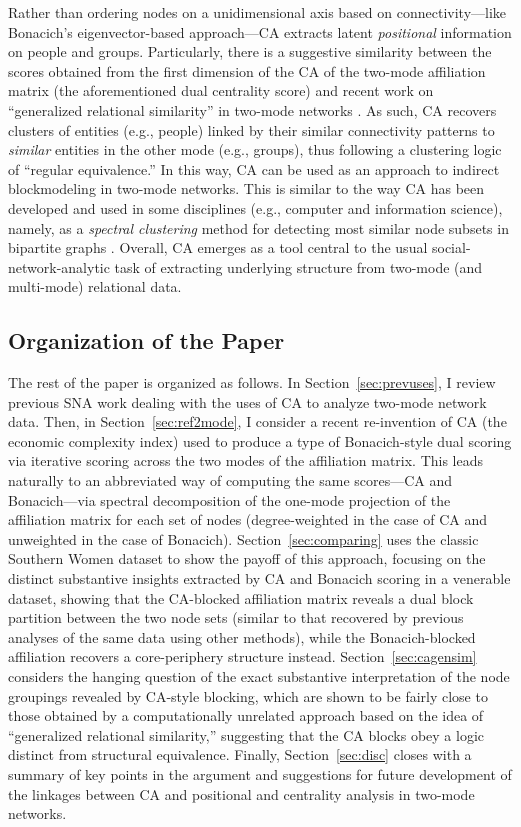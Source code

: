 \documentclass[a4paper,fleqn]{cas-sc}
\begin{document}
Rather than ordering nodes on a unidimensional axis based on connectivity---like Bonacich's \citet{bonacich1991simultaneous} eigenvector-based approach---CA extracts latent \textit{positional} information on people and groups. Particularly, there is a suggestive similarity between the scores obtained from the first dimension of the CA of the two-mode affiliation matrix (the aforementioned dual centrality score) and recent work on ``generalized relational similarity'' in two-mode networks \citep{kovacs2010generalized, lizardo2024two}. As such, CA recovers clusters of entities (e.g., people) linked by their similar connectivity patterns to \textit{similar} entities in the other mode (e.g., groups), thus following a clustering logic of ``regular equivalence.'' In this way, CA can be used as an approach to indirect blockmodeling in two-mode networks. This is similar to the way CA has been developed and used in some disciplines (e.g., computer and information science), namely, as a \textit{spectral clustering} method for detecting most similar node subsets in bipartite graphs \citep{wu2022spectral}. Overall, CA emerges as a tool central to the usual social-network-analytic task of extracting underlying structure from two-mode (and multi-mode) relational data. 

\subsection{Organization of the Paper} \label{subsec:org}
The rest of the paper is organized as follows. In Section~\ref{sec:prevuses}, I review previous SNA work dealing with the uses of CA to analyze two-mode network data. Then, in Section~\ref{sec:ref2mode}, I consider a recent re-invention of CA (the economic complexity index) used to produce a type of Bonacich-style dual scoring via iterative scoring across the two modes of the affiliation matrix. This leads naturally to an abbreviated way of computing the same scores---CA and Bonacich---via spectral decomposition of the one-mode projection of the affiliation matrix for each set of nodes (degree-weighted in the case of CA and unweighted in the case of Bonacich). Section~\ref{sec:comparing} uses the classic Southern Women dataset to show the payoff of this approach, focusing on the distinct substantive insights extracted by CA and Bonacich scoring in a venerable dataset, showing that the CA-blocked affiliation matrix reveals a dual block partition between the two node sets (similar to that recovered by previous analyses of the same data using other methods), while the Bonacich-blocked affiliation recovers a core-periphery structure instead. Section~\ref{sec:cagensim} considers the hanging question of the exact substantive interpretation of the node groupings revealed by CA-style blocking, which are shown to be fairly close to those obtained by a computationally unrelated approach based on the idea of ``generalized relational similarity,'' suggesting that the CA blocks obey a logic distinct from structural equivalence. Finally, Section~\ref{sec:disc} closes with a summary of key points in the argument and suggestions for future development of the linkages between CA and positional and centrality analysis in two-mode networks.  
\end{document}
